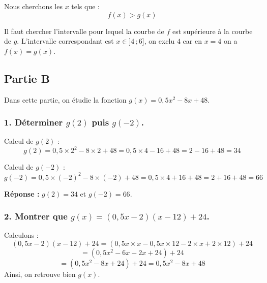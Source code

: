 \documentclass[a4paper,11pt]{article}
\begin{document}
Nous cherchons les $x$ tels que :
\[
f(x) > g(x)
\]
%

Il faut chercher l'intervalle pour lequel la courbe de $f$ est supérieure à la courbe de $g$.
L'intervalle correspondant est $x \in ]4\,;6]$, on exclu $4$ car en $x=4$ on a $f(x) = g(x)$.


\bigskip

\subsection*{Partie B}

Dans cette partie, on étudie la fonction $g(x) = 0{,}5x^2 - 8x + 48$.

\subsubsection*{1. Déterminer $g(2)$ puis $g(-2)$.}

Calcul de $g(2)$ :
\[
g(2) = 0{,}5 \times 2^2 - 8 \times 2 + 48 = 0{,}5 \times 4 - 16 + 48 = 2 - 16 + 48 = 34
\]

Calcul de $g(-2)$ :
\[
g(-2) = 0{,}5 \times (-2)^2 - 8 \times (-2) + 48 = 0{,}5 \times 4 + 16 + 48 = 2 + 16 + 48 = 66
\]

\textbf{Réponse :} $g(2) = 34$ et $g(-2) = 66$.

\bigskip

\subsubsection*{2. Montrer que $g(x) = (0{,}5x - 2)(x - 12) + 24$.}

Calculons :
\[
(0{,}5x - 2)(x - 12) + 24 = \left(0{,}5x \times x - 0{,}5x \times 12 - 2 \times x + 2 \times 12\right) + 24
\]
\[
= \left(0{,}5x^2 - 6x - 2x + 24\right) + 24
\]
\[
= \left(0{,}5x^2 - 8x + 24\right) + 24 = 0{,}5x^2 - 8x + 48
\]
Ainsi, on retrouve bien $g(x)$.
\end{document}
